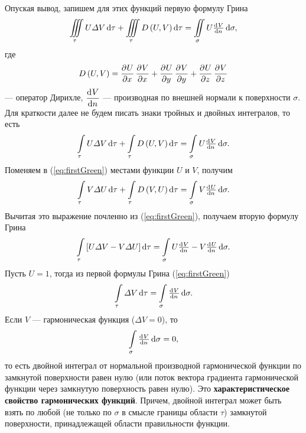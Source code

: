 \documentclass[11pt, a4paper]{article}
\theoremstyle{plain}
\theoremstyle{definition}
\theoremstyle{remark}
\begin{document}
Опуская вывод, запишем для этих функций первую формулу Грина
\begin{equation*}
    \iiint\limits_\tau U\Delta V\dif\tau + \iiint\limits_\tau D\left( U, V \right)\dif\tau =
    \iint\limits_\sigma U\od{V}{n}\dif\sigma,
\end{equation*}
где
\begin{equation*}
    D\left( U, V \right) = \dpd{U}{x}\dpd{V}{x} + \dpd{U}{y}\dpd{V}{y} + \dpd{U}{z}\dpd{V}{z}
\end{equation*}
--- оператор Дирихле, $\dod{V}{n}$ --- производная по внешней нормали к поверхности $\sigma$.
Для краткости далее не будем писать знаки тройных и двойных интегралов, то есть
\begin{equation}
    \label{eq:firstGreen}
    \int\limits_\tau U\Delta V\dif\tau + \int\limits_\tau D\left( U, V \right)\dif\tau =
    \int\limits_\sigma U\od{V}{n}\dif\sigma.
\end{equation}
Поменяем в (\ref{eq:firstGreen}) местами функции $U$ и $V$, получим
\begin{equation*}
    \int\limits_\tau V\Delta U\dif\tau + \int\limits_\tau D\left( V, U \right)\dif\tau =
    \int\limits_\sigma V\od{U}{n}\dif\sigma.
\end{equation*}
Вычитая это выражение почленно из (\ref{eq:firstGreen}), получаем вторую формулу Грина
\begin{equation}
    \label{eq:secondGreen}
    \int\limits_\tau \left[ U\Delta V - V\Delta U \right] \dif\tau  =
    \int\limits_\sigma U\od{V}{n} - V\od{U}{n} \dif\sigma.
\end{equation}
Пусть $U = 1$, тогда из первой формулы Грина (\ref{eq:firstGreen})
\begin{equation}
    \label{eq:firstGreenU1}
    \int\limits_\tau \Delta V\dif\tau = \int\limits_\sigma\od{V}{n}\dif\sigma.
\end{equation}
Если $V$ --- гармоническая функция ($\Delta V = 0$), то
\begin{equation}
    \label{eq:harmchar}
    \int\limits_\sigma\od{V}{n}\dif\sigma = 0,
\end{equation}
то есть двойной интеграл от нормальной производной гармонической функции по замкнутой поверхности
равен нулю (или поток вектора градиента гармонической функции через замкнутую поверхность равен
нулю). Это \textbf{характеристическое свойство гармонических функций}. 
Причем, двойной интеграл может быть взять по любой (не только по $\sigma$ в смысле границы
области $\tau$) замкнутой поверхности, принадлежащей
области правильности функции. 
\end{document}
